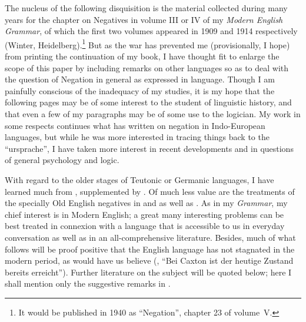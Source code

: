 \addchap{\lsPrefaceTitle} \label{ch:preface}
 
 The nucleus of the following disquisition is the material collected during many years for the chapter on Negatives in volume III or IV of my \textit{Modern English Grammar},
 of which the first two volumes appeared in 1909 and 1914 respectively (Winter, Heidelberg).\footnote{It would be published in 1940 as ``Negation'', chapter 23 of volume~V. %
\eds} But as the war has prevented me (provisionally, I hope) from printing the continuation of my book, I have thought fit to enlarge the scope of this paper by including remarks on other languages so as to deal with the question of Negation in general as expressed in language. Though I am painfully conscious of the inadequacy of my studies, it is my hope that the following pages may be of some interest to the student of linguistic history, and that even a few of my paragraphs may be of some use to the logician. My work in some respects continues what \citet[\href{https://archive.org/details/grundrissderver01delbgoog/page/518/mode/2up?view=theater}{519ff}]{delbruck1897vergleichende} has written on negation in Indo-European languages, but while he was more interested in tracing things back to the ``ursprache'', I have taken more interest in recent developments and in questions of general psychology and logic.
 
With regard to the older stages of Teutonic or Germanic languages, I have learned much from \citet{delbruck_negativen_1910}, supplemented by \citet{neckel1912germanischen}. Of much less value are the treatments of the specially Old English negatives in \citet{knork1907negation} and \citet{rauert1910negation} as well as \citet{einenkel1911englische}. As in my \textit{Grammar}, my chief interest is in Modern English; a great many interesting problems can be best treated in connexion with a language that is accessible to us in everyday conversation as well as in an all\hyp comprehensive literature. Besides, much of what follows will be proof positive that the English language has not stagnated in the modern period, as \citeauthor{einenkel1911englische} would have us believe (\citeyear[234]{einenkel1911englische}, ``Bei Caxton ist der heutige Zustand bereits erreicht''). Further literature on the subject will be quoted below; here I shall mention only the suggestive remarks in \citet[199ff]{vanginneken1907principes}.
